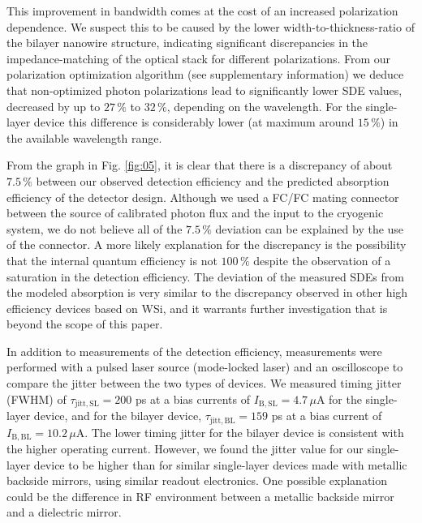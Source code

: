 \documentclass[aip,apl,showpacs,showkeys,preprint,superscriptaddress,preprintnumbers,amsmath,amssymb]{revtex4-1}
\begin{document}
\begin{bibunit}
This improvement in bandwidth comes at the cost of an increased polarization dependence. We suspect this to be caused by the lower width-to-thickness-ratio of the bilayer nanowire structure, indicating significant discrepancies in the impedance-matching of the optical stack for different polarizations. From our polarization optimization algorithm (see supplementary information) we deduce that non-optimized photon polarizations lead to significantly lower SDE values, decreased by up to $27\,\%$ to $32\,\%$, depending on the wavelength. For the single-layer device this difference is considerably lower (at maximum around $15\,\%$) in the available wavelength range.

From the graph in Fig. \ref{fig:05}, it is clear that there is a discrepancy of about $7.5\,\%$ between our observed detection efficiency and the predicted absorption efficiency of the detector design.  Although we used a FC/FC mating connector between the source of calibrated photon flux and the input to the cryogenic system, we do not believe all of the $7.5\,\%$ deviation can be explained by the use of the connector. A more likely explanation for the discrepancy is the possibility that the internal quantum efficiency is not $100\,\%$ despite the observation of a saturation in the detection efficiency. The deviation of the measured SDEs from the modeled absorption is very similar to the discrepancy observed in other high efficiency devices based on WSi\cite{Marsili2013}, and it warrants further investigation that is beyond the scope of this paper.

In addition to measurements of the detection efficiency, measurements were performed with a pulsed laser source (mode-locked laser) and an oscilloscope to compare the jitter between the two types of devices. We measured timing jitter (FWHM) of $\tau_\mathrm{jitt,SL} = 200$ ps at a bias currents of $I_\mathrm{B,SL} = 4.7\,\mu$A for the single-layer device, and for the bilayer device, $\tau_\mathrm{jitt,BL} = 159$ ps at a bias current of $I_\mathrm{B,BL}  = 10.2\,\mu$A. The lower timing jitter for the bilayer device is consistent with the higher operating current. However, we found the jitter value for our single-layer device to be higher than for similar single-layer devices made with metallic backside mirrors, using similar readout electronics. One possible explanation could be the difference in RF environment between a metallic backside mirror and a dielectric mirror\cite{Santavicca2016}.




\end{bibunit}
\end{document}
